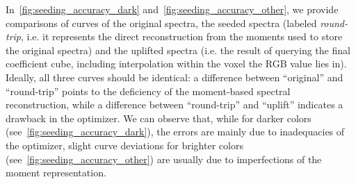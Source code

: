In~\cref{fig:seeding_accuracy_dark} and~\cref{fig:seeding_accuracy_other}, we provide comparisons of curves of the original spectra, the seeded spectra (labeled \emph{round-trip}, i.e. it represents the direct reconstruction from the moments used to store the original spectra) and the uplifted spectra (i.e. the result of querying the final coefficient cube, including interpolation within the voxel the RGB value lies in). Ideally, all three curves should be identical: a difference between ``original'' and ``round-trip'' points to the deficiency of the moment-based spectral reconstruction, while a difference between ``round-trip'' and ``uplift'' indicates a drawback in the optimizer. We can observe that, while for darker colors (see~\cref{fig:seeding_accuracy_dark}), the errors are mainly due to inadequacies of the optimizer, slight curve deviations for brighter colors (see~\cref{fig:seeding_accuracy_other}) are usually due to imperfections of the moment representation.

